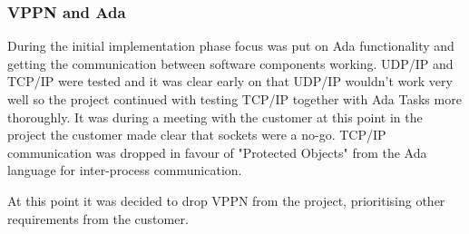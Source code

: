\subsubsection{VPPN and Ada}
During the initial implementation phase focus was put on Ada functionality and
getting the communication between software components working. UDP/IP and TCP/IP
were tested and it was clear early on that UDP/IP wouldn't work very well so
the project continued with testing TCP/IP together with Ada Tasks more
thoroughly. It was during a meeting with the customer at this point in the
project the customer made clear that sockets were a no-go. TCP/IP communication
was dropped in favour of "Protected Objects" from the Ada language for
inter-process communication.

At this point it was decided to drop VPPN from the project, prioritising other
requirements from the customer.

%
